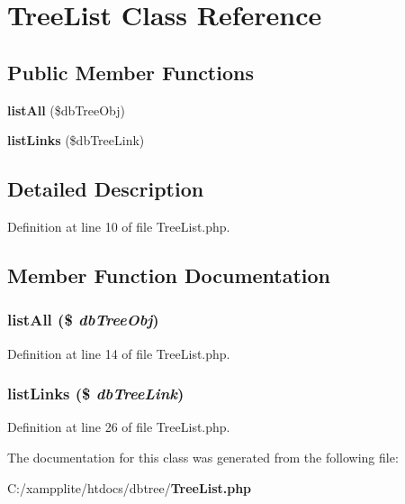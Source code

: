 \section{TreeList Class Reference}
\label{class_tree_list}
\subsection*{Public Member Functions}
\begin{DoxyCompactItemize}
\item 
{\bf listAll} (\$dbTreeObj)
\item 
{\bf listLinks} (\$dbTreeLink)
\end{DoxyCompactItemize}


\subsection{Detailed Description}


Definition at line 10 of file TreeList.php.

\subsection{Member Function Documentation}
\subsubsection[{listAll}]{\setlength{\rightskip}{0pt plus 5cm}listAll (\$ {\em dbTreeObj})}\label{class_tree_list_a6779da399c7834de276ea1f9f99f3b3b}


Definition at line 14 of file TreeList.php.
\subsubsection[{listLinks}]{\setlength{\rightskip}{0pt plus 5cm}listLinks (\$ {\em dbTreeLink})}\label{class_tree_list_a9917785457ce49ff20cfc92eb4b1c407}


Definition at line 26 of file TreeList.php.

The documentation for this class was generated from the following file:\begin{DoxyCompactItemize}
\item 
C:/xampplite/htdocs/dbtree/{\bf TreeList.php}\end{DoxyCompactItemize}

